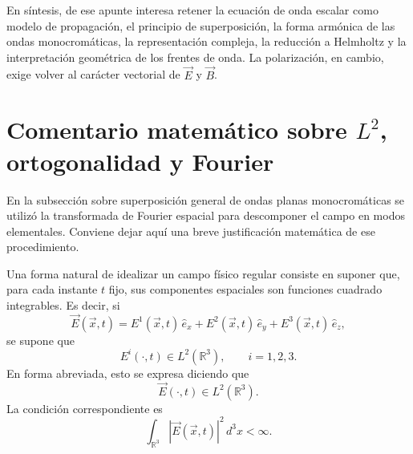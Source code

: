 \documentclass[12pt,a4paper]{article}
\theoremstyle{definition}
\theoremstyle{plain}
\numberwithin{equation}{section}
\theoremstyle{remark}
\newcommand{\E}{\vec{E}}
\newcommand{\B}{\vec{B}}
\begin{document}
En síntesis, de ese apunte interesa retener la ecuación de onda escalar como modelo de propagación, el principio de superposición, la forma armónica de las ondas monocromáticas, la representación compleja, la reducción a Helmholtz y la interpretación geométrica de los frentes de onda. La polarización, en cambio, exige volver al carácter vectorial de $\E$ y $\B$.


\section[Comentario matemático sobre L2, ortogonalidad y Fourier]{Comentario matemático sobre $L^2$, ortogonalidad y Fourier}
\label{ap:l2-fourier}

En la subsección sobre superposición general de ondas planas monocromáticas se utilizó la transformada de Fourier espacial para descomponer el campo en modos elementales. Conviene dejar aquí una breve justificación matemática de ese procedimiento.

Una forma natural de idealizar un campo físico regular consiste en suponer que, para cada instante $t$ fijo, sus componentes espaciales son funciones cuadrado integrables. Es decir, si
\begin{equation*}
    \vec E(\vec x,t)=E^1(\vec x,t)\,\hat e_x+E^2(\vec x,t)\,\hat e_y+E^3(\vec x,t)\,\hat e_z,
\end{equation*}
se supone que
\begin{equation*}
    E^i(\cdot,t)\in L^2(\mathbb R^3),\qquad i=1,2,3.
\end{equation*}
En forma abreviada, esto se expresa diciendo que
\begin{equation*}
    \vec E(\cdot,t)\in L^2(\mathbb R^3).
\end{equation*}
La condición correspondiente es
\begin{equation*}
    \int_{\mathbb R^3}|\vec E(\vec x,t)|^2\,d^3x<\infty.
\end{equation*}
\end{document}
